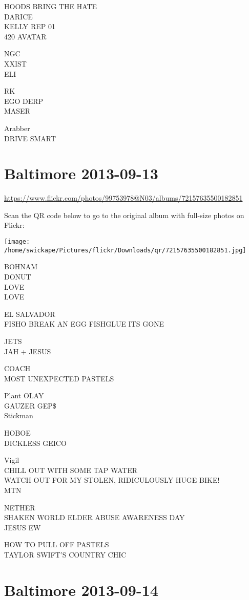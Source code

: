 \documentclass[10pt,letterpaper]{article}
\begin{document}
HOODS BRING THE HATE\\
DARICE\\
KELLY REP 01\\
420 AVATAR

NGC\\
XXIST\\
ELI

RK\\
EGO DERP\\
MASER

Arabber\\
DRIVE SMART


\section*{Baltimore 2013-09-13}

\url{https://www.flickr.com/photos/99753978@N03/albums/72157635500182851}

Scan the QR code below to go to the original album with full-size photos on Flickr:

\texttt{[image: /home/swickape/Pictures/flickr/Downloads/qr/72157635500182851.jpg]}


BOHNAM\\
DONUT\\
LOVE\\
LOVE

EL SALVADOR\\
FISHO BREAK AN EGG FISHGLUE ITS GONE

JETS\\
JAH + JESUS

COACH\\
MOST UNEXPECTED PASTELS

Plant OLAY\\
GAUZER GEP\$\\
Stickman

HOBOE\\
DICKLESS GEICO

Vigil\\
CHILL OUT WITH SOME TAP WATER\\
WATCH OUT FOR MY STOLEN, RIDICULOUSLY HUGE BIKE!\\
MTN

NETHER\\
SHAKEN WORLD ELDER ABUSE AWARENESS DAY\\
JESUS EW

HOW TO PULL OFF PASTELS\\
TAYLOR SWIFT'S COUNTRY CHIC


\section*{Baltimore 2013-09-14}
\end{document}
